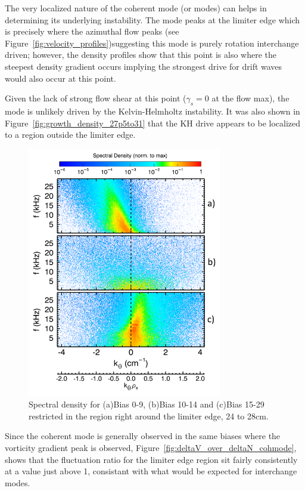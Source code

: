 \documentclass[aip,pop,amsmath,amssymb,reprint,superscriptaddress]{revtex4-1} %
\begin{document}
The very localized nature of the coherent mode (or modes) can helps in determining its underlying instability. The mode peaks at the limiter edge which is precisely where the azimuthal flow peaks (see Figure~\ref{fig:velocity_profiles})suggesting this mode is purely rotation interchange driven; however, the density profiles show that this point is also where the steepest density gradient occurs implying the strongest drive for drift waves would also occur at this point. 

Given the lack of strong flow shear at this point ($\gamma_{s} = 0$ at the flow max), the mode is unlikely driven by the Kelvin-Helmholtz instability. It was also shown in Figure~\ref{fig:growth_density_27p5to31} that the KH drive appears to be localized to a region outside the limiter edge.

\begin{figure}[!htbp]
\centerline{
\includegraphics[width=8.5cm]{k_spec_byBias_24to28_lab}}%
\caption{\label{fig:k_spec_byBias_24to28} Spectral density for (a)Bias 0-9, (b)Bias 10-14 and (c)Bias 15-29 restricted in the region right around the limiter edge, 24 to 28cm.}
\end{figure}

Since the coherent mode is generally observed in the same biases where the vorticity gradient peak is observed,  Figure~\ref{fig:deltaV_over_deltaN_cohmode}, shows that the fluctuation ratio for the limiter edge region sit fairly consistently at a value just above 1, consistant with what would be expected for interchange modes.
\end{document}
